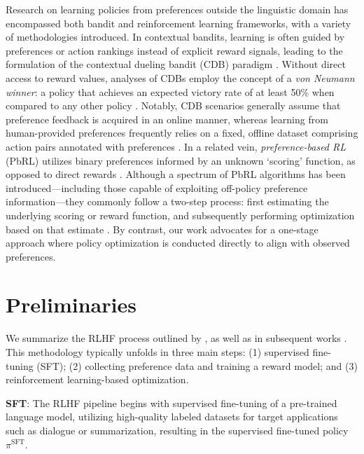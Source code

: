 Research on learning policies from preferences outside the linguistic domain has encompassed both bandit and reinforcement learning frameworks, with a variety of methodologies introduced. In contextual bandits, learning is often guided by preferences or action rankings instead of explicit reward signals, leading to the formulation of the contextual dueling bandit (CDB) paradigm \citep{yue2012karmed,dudik2015contextual}. Without direct access to reward values, analyses of CDBs employ the concept of a \textit{von Neumann winner}: a policy that achieves an expected victory rate of at least 50\% when compared to any other policy \citep{dudik2015contextual}. Notably, CDB scenarios generally assume that preference feedback is acquired in an online manner, whereas learning from human-provided preferences frequently relies on a fixed, offline dataset comprising action pairs annotated with preferences \citep{yan2022human}. In a related vein, \textit{preference-based RL} (PbRL) utilizes binary preferences informed by an unknown ‘scoring’ function, as opposed to direct rewards \citep{BusaFekete2014,ruiz2023dueling}. Although a spectrum of PbRL algorithms has been introduced—including those capable of exploiting off-policy preference information—they commonly follow a two-step process: first estimating the underlying scoring or reward function, and subsequently performing optimization based on that estimate \citep{jain2013learning,BusaFekete2014,christiano2017deep,sadigh2017active,kupcsik2018learning}. By contrast, our work advocates for a one-stage approach where policy optimization is conducted directly to align with observed preferences.

\section{Preliminaries}\label{section:prelims}

We summarize the RLHF process outlined by \citeauthor{ziegler2020finetuning}, as well as in subsequent works \citep{stiennon2022learning, bai2022training, ouyang2022training}. This methodology typically unfolds in three main steps: (1) supervised fine-tuning (SFT); (2) collecting preference data and training a reward model; and (3) reinforcement learning-based optimization.

\textbf{SFT}: The RLHF pipeline begins with supervised fine-tuning of a pre-trained language model, utilizing high-quality labeled datasets for target applications such as dialogue or summarization, resulting in the supervised fine-tuned policy $\pi^\text{SFT}$.

